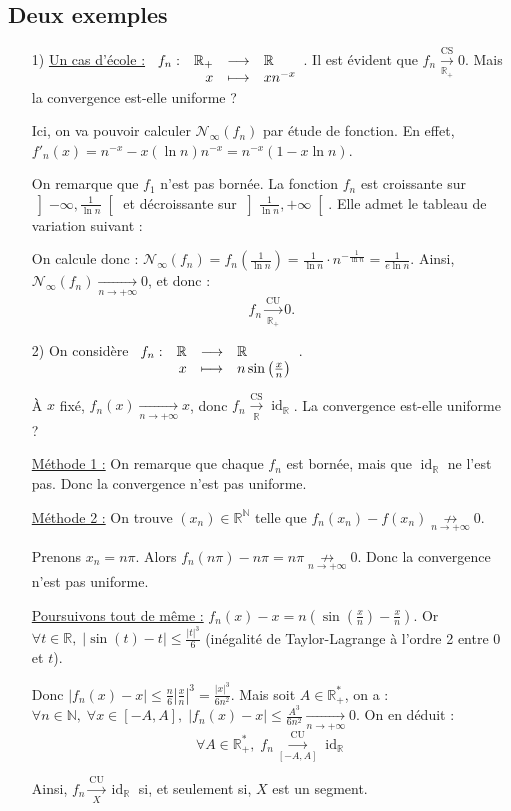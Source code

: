 \documentclass[12pt]{book}
\let\ensembleNombre\mathbb
\newcommand*\N{\ensuremath{\ensembleNombre{N}}}
\newcommand*\R{\ensuremath{\ensembleNombre{R}}}
\newcommand{\app}[5]{\ensuremath{
\begin{array}[t]{lrcl}
#1 : & #2 & \longrightarrow & #3 \\
    & #4 & \longmapsto & #5 \end{array}
}}
\newcommand{\limite}[2]{\ensuremath{\underset{#1 \to #2}{\longrightarrow}}}
\newcommand{\notlimite}[2]{\ensuremath{\underset{#1 \to #2}{\not\longrightarrow}}}
\newcommand{\ls}[1]{\ensuremath{\overset{\mathrm{CS}}{\underset{#1}{\longrightarrow}}}}
\newcommand{\lu}[1]{\ensuremath{\overset{\mathrm{CU}}{\underset{#1}{\longrightarrow}}}}
\DeclareMathOperator{\id}{id}
\theoremstyle{definition}
\theoremstyle{remark}
\begin{document}
	\subsection{Deux exemples}
	\begin{itemize}
	\item[1)] \underline{Un cas d'école :} $\app{f_n}{\R_+}{\R}{x}{xn^{-x}}$. Il est évident que $f_n \ls{\R_+} 0$. Mais la convergence est-elle uniforme ?
	
	Ici, on va pouvoir calculer $\mathcal N_\infty(f_n)$ par étude de fonction. En effet, $f'_n(x) = n^{-x} - x(\ln n)n^{-x} = n^{-x}(1 - x\ln n)$.
	
	On remarque que $f_1$ n'est pas bornée. La fonction $f_n$ est croissante sur $\left] -\infty , \frac{1}{\ln n} \right[$ et décroissante sur $\left] \frac{1}{\ln n}, +\infty \right[$. Elle admet le tableau de variation suivant :

	\begin{center}
	\end{center}
	
	On calcule donc : $\mathcal N_\infty(f_n) = f_n \left( \frac{1}{\ln n} \right) = \frac{1}{\ln n} \cdot n^{-\frac{1}{\ln n}} = \frac{1}{e \ln n}$. Ainsi, $\mathcal N_\infty(f_n) \limite{n}{+\infty} 0$, et donc :
	\[\boxed{f_n \lu{\R_+} 0.}\]
	
	\item[2)] On considère $\app{f_n}{\R}{\R}{x}{n\sin\left( \frac{x}{n} \right)}$.
	
	À $x$ fixé, $f_n(x) \limite{n}{+\infty} x$, donc $f_n \ls \R \id_\R$. La convergence est-elle uniforme ?
	
	\underline{Méthode 1 :} On remarque que chaque $f_n$ est bornée, mais que $\id_\R$ ne l'est pas. Donc la convergence n'est pas uniforme.
	
	\underline{Méthode 2 :} On trouve $(x_n) \in \R^\N$ telle que $f_n(x_n) - f(x_n) \notlimite{n}{+\infty} 0$.
	
	Prenons $x_n = n\pi$. Alors $f_n(n\pi) - n\pi = n\pi \notlimite{n}{+\infty} 0$. Donc la convergence n'est pas uniforme.
	
	\underline{Poursuivons tout de même :} $f_n(x) - x = n\left( \sin\left( \frac{x}{n} \right) - \frac{x}{n} \right)$. Or $\forall t \in \R,\; |\sin(t) - t| \leq \frac{|t|^3}{6}$ (inégalité de Taylor-Lagrange à l'ordre 2 entre 0 et $t$).
	
	Donc $|f_n(x) - x| \leq \frac{n}{6}	 \left|\frac{x}{n}\right|^3 = \frac{|x|^3}{6n^2}$. Mais soit $A \in \R_+^*$, on a : $\forall n \in \N,\; \forall x \in [-A, A],\; |f_n(x) - x| \leq \frac{A^3}{6n^2} \limite{n}{+\infty} 0$. On en déduit :
	\[ \forall A \in \R_+^*,\; f_n \lu{[-A, A]} \id_\R \]
	
	Ainsi, $f_n \lu{X} \id_\R$ si, et seulement si, $X$ est un segment.
	\end{itemize}
	
\end{document}
